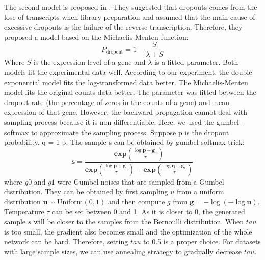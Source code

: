 The second model is proposed in \cite{andrews2017modelling}. They suggested that dropouts comes from the lose of transcripts when library preparation and assumed that the main cause of excessive dropouts is the failure of the reverse transcription. Therefore, they proposed a model based on the Michaelis-Menten function:
\begin{equation}
    P_{\text {dropout}}=1-\frac{S}{\lambda+S}
\end{equation}
Where $S$ is the expression level of a gene and $\lambda$ is a fitted parameter. 
Both models fit the experimental data well. According to our experiment, the double exponential model fits the log-transformed data better. The Michaelis-Menten model fits the original counts data better. 
The parameter was fitted between the dropout rate (the percentage of zeros in the counts of a gene) and mean expression of that gene.
However, the backward propagation cannot deal with sampling process because it is non-differentiable. Here, we used the gumbel-softmax \cite{jang2016categorical} to approximate the sampling process. Suppose p is the dropout probability, q = 1-p. The sample s can be obtained by gumbel-softmax trick:
\begin{equation}
    \boldsymbol{s}=\frac{\boldsymbol{e} \boldsymbol{x} \boldsymbol{p}\left(\frac{\log \boldsymbol{p}+\boldsymbol{g}_{0}}{\tau}\right)}{\boldsymbol{e x p}\left(\frac{\log \boldsymbol{p}+\boldsymbol{g}_{0}}{\tau}\right)+\boldsymbol{e} \boldsymbol{x} \boldsymbol{p}\left(\frac{\log \boldsymbol{q}+\boldsymbol{g}_{1}}{\tau}\right)}
\end{equation}
where $g0$ and $g1$ were Gumbel noises that are sampled from a Gumbel distribution. They can be obtained by first sampling $u$ from a uniform distribution $\boldsymbol{u} \sim \text {Uniform}(0,1)$ and then compute $g$ from $\boldsymbol{g}=-\log (-\log \boldsymbol{u})$. Temperature $\tau$ can be set between 0 and 1. As it is closer to 0, the generated sample $s$ will be closer to the samples from the Bernoulli distribution. When $tau$ is too small, the gradient also becomes small and the optimization of the whole network can be hard. Therefore, setting $tau$ to 0.5 is a proper choice. For datasets with large sample sizes, we can use annealing strategy to gradually decrease $tau$.

